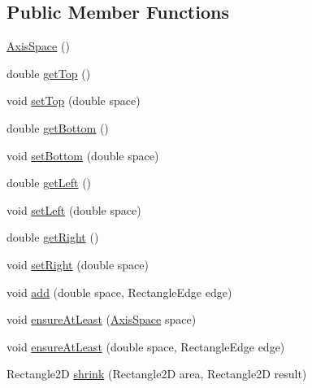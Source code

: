 \subsection*{Public Member Functions}
\begin{DoxyCompactItemize}
\item 
\mbox{\hyperlink{classorg_1_1jfree_1_1chart_1_1axis_1_1_axis_space_a66379a469c59cceeb636f86ff9513ee4}{Axis\+Space}} ()
\item 
double \mbox{\hyperlink{classorg_1_1jfree_1_1chart_1_1axis_1_1_axis_space_a970a46b5d11e292fa77176a3c8e9729d}{get\+Top}} ()
\item 
void \mbox{\hyperlink{classorg_1_1jfree_1_1chart_1_1axis_1_1_axis_space_a04de149aaf43e467c5eeceea745ade9d}{set\+Top}} (double space)
\item 
double \mbox{\hyperlink{classorg_1_1jfree_1_1chart_1_1axis_1_1_axis_space_a40abfcc343806c36e357168bf50814cc}{get\+Bottom}} ()
\item 
void \mbox{\hyperlink{classorg_1_1jfree_1_1chart_1_1axis_1_1_axis_space_af85e8e906392b5fe7366236c1b564fd7}{set\+Bottom}} (double space)
\item 
double \mbox{\hyperlink{classorg_1_1jfree_1_1chart_1_1axis_1_1_axis_space_af81c193f1268c9c3f4fddf2ce9b1f3f4}{get\+Left}} ()
\item 
void \mbox{\hyperlink{classorg_1_1jfree_1_1chart_1_1axis_1_1_axis_space_af2f580ae0f26771ce996d73d82830628}{set\+Left}} (double space)
\item 
double \mbox{\hyperlink{classorg_1_1jfree_1_1chart_1_1axis_1_1_axis_space_a96cdf0e9cfa6eccaa8163696afd16e8d}{get\+Right}} ()
\item 
void \mbox{\hyperlink{classorg_1_1jfree_1_1chart_1_1axis_1_1_axis_space_a6a385c00f056d34d36d1332821ef81c1}{set\+Right}} (double space)
\item 
void \mbox{\hyperlink{classorg_1_1jfree_1_1chart_1_1axis_1_1_axis_space_ad9a1b609c7c1cb9552867ea361b748c8}{add}} (double space, Rectangle\+Edge edge)
\item 
void \mbox{\hyperlink{classorg_1_1jfree_1_1chart_1_1axis_1_1_axis_space_a4911a51d8be9bd032a8d8b15d562c4ea}{ensure\+At\+Least}} (\mbox{\hyperlink{classorg_1_1jfree_1_1chart_1_1axis_1_1_axis_space}{Axis\+Space}} space)
\item 
void \mbox{\hyperlink{classorg_1_1jfree_1_1chart_1_1axis_1_1_axis_space_a5fc18e5e08f2d8acc55b1da58ae1f2dd}{ensure\+At\+Least}} (double space, Rectangle\+Edge edge)
\item 
Rectangle2D \mbox{\hyperlink{classorg_1_1jfree_1_1chart_1_1axis_1_1_axis_space_a4338e8f81c7ce8a380877abc0df1c0a5}{shrink}} (Rectangle2D area, Rectangle2D result)

\end{DoxyCompactItemize}
